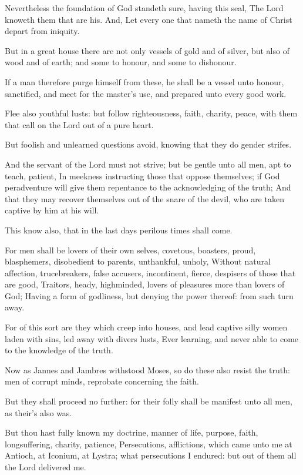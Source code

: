 \Verse Nevertheless the foundation of God standeth sure, having this seal, The Lord knoweth them that are his. And, Let every one that nameth the name of Christ depart from iniquity.

\Verse But in a great house there are not only vessels of gold and of silver, but also of wood and of earth; and some to honour, and some to dishonour.

\Verse If a man therefore purge himself from these, he shall be a vessel unto honour, sanctified, and meet for the master's use, and prepared unto every good work.

\Verse Flee also youthful lusts: but follow righteousness, faith, charity, peace, with them that call on the Lord out of a pure heart.

\Verse But foolish and unlearned questions avoid, knowing that they do gender strifes.

\Verse And the servant of the Lord must not strive; but be gentle unto all men, apt to teach, patient, \Verse In meekness instructing those that oppose themselves; if God peradventure will give them repentance to the acknowledging of the truth; \Verse And that they may recover themselves out of the snare of the devil, who are taken captive by him at his will.


\Chapter
\Verse This know also, that in the last days perilous times shall come.

\Verse For men shall be lovers of their own selves, covetous, boasters, proud, blasphemers, disobedient to parents, unthankful, unholy, \Verse Without natural affection, trucebreakers, false accusers, incontinent, fierce, despisers of those that are good, \Verse Traitors, heady, highminded, lovers of pleasures more than lovers of God; \Verse Having a form of godliness, but denying the power thereof: from such turn away.

\Verse For of this sort are they which creep into houses, and lead captive silly women laden with sins, led away with divers lusts, \Verse Ever learning, and never able to come to the knowledge of the truth.

\Verse Now as Jannes and Jambres withstood Moses, so do these also resist the truth: men of corrupt minds, reprobate concerning the faith.

\Verse But they shall proceed no further: for their folly shall be manifest unto all men, as their's also was.

\Verse But thou hast fully known my doctrine, manner of life, purpose, faith, longsuffering, charity, patience, \Verse Persecutions, afflictions, which came unto me at Antioch, at Iconium, at Lystra; what persecutions I endured: but out of them all the Lord delivered me.

